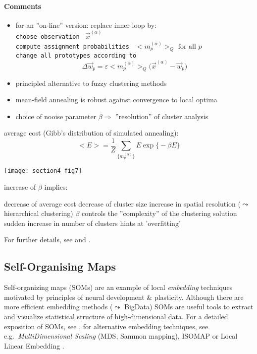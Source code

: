 \paragraph{Comments}
\begin{itemize}
	\item for an ''on-line'' version: replace inner loop by:  \\
		\verb|choose observation | $\vec{x}^{(\alpha)}$ \\
		\verb|compute assignment probabilities | $\big< m_p^{(\alpha)}
			\big>_Q \text{ for all } p$ \\
		\verb|change all prototypes according to|
		\[ \Delta \vec{w}_p = \varepsilon \big< m_p^{(\alpha)}
			\big>_Q \big( \vec{x}^{(\alpha)} - \vec{w}_p \big) 
		\]
	\item principled alternative to fuzzy clustering methods
	\item mean-field annealing is robust against convergence to local optima
	\item choice of nooise parameter $\beta \Rightarrow$ ''resolution''
		of cluster analysis
\end{itemize}
average cost (Gibb's distribution of simulated annealing):
\begin{equation}
	\big< E \big> = \frac{1}{Z} \sum\limits_{\big\{ m_p^{(\alpha)} \big\}}
	E \exp \big\{ -\beta E \big\}
\end{equation}
\begin{center}\texttt{[image: section4\_fig7]}
\end{center}
increase of $\beta$ implies:
\begin{itemize}
  \itr decrease of average cost 
  \itr decrease of cluster size 
  \itr increase in spatial resolution  ($\leadsto$ hierarchical clustering)
  \itR $\beta$ controls the ''complexity'' of the clustering solution
  \itr sudden increase in number of clusters hints at 'overfitting'
\end{itemize}
For further details, see \textcite{RoseEtAl1990} and \textcite{Rose1998}. 


\newpage						%
\subsection{Self-Organising Maps}
Self-organizing maps (SOMs) are an example of local \emph{embedding}
techniques motivated by principles of neural development \&
plasticity. Although there are more efficient embedding methods
($\leadsto$ BigData) SOMs are useful tools to extract and visualize
statistical structure of high-dimensional data. For a detailed exposition of SOMs, see \textcite{Kohonen2001}, for alternative embedding
techniques, see e.g.\ \emph{MultiDimensional Scaling} (MDS, Sammon
mapping), ISOMAP \textcite{TenenbaumEtAl2000} or Local Linear
Embedding \textcite{RoweisSaul2000}. 

